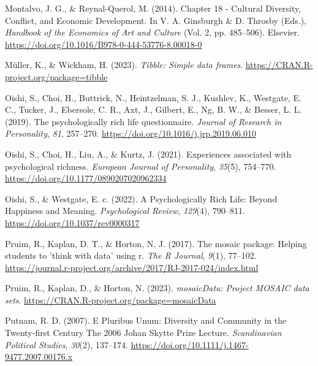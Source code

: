 \documentclass[
  man,floatsintext]{apa7}
\newlength{\cslhangindent}
\newlength{\cslentryspacingunit} %
\newenvironment{CSLReferences}[2] %
 {%
  \setlength{\parindent}{0pt}
  \ifodd #1
  \let\oldpar\par
  \def\par{\hangindent=\cslhangindent\oldpar}
  \fi
  \setlength{\parskip}{#2\cslentryspacingunit}
 }%
 {}
\begin{document}
\begin{CSLReferences}{1}{0}
\leavevmode{}%
Montalvo, J. G., \& Reynal-Querol, M. (2014). Chapter 18 - {Cultural Diversity}, {Conflict}, and {Economic Development}. In V. A. Ginsburgh \& D. Throsby (Eds.), \emph{Handbook of the {Economics} of {Art} and {Culture}} (Vol. 2, pp. 485--506). Elsevier. \url{https://doi.org/10.1016/B978-0-444-53776-8.00018-0}

\leavevmode{}%
Müller, K., \& Wickham, H. (2023). \emph{Tibble: Simple data frames}. \url{https://CRAN.R-project.org/package=tibble}

\leavevmode{}%
Oishi, S., Choi, H., Buttrick, N., Heintzelman, S. J., Kushlev, K., Westgate, E. C., Tucker, J., Ebersole, C. R., Axt, J., Gilbert, E., Ng, B. W., \& Besser, L. L. (2019). The psychologically rich life questionnaire. \emph{Journal of Research in Personality}, \emph{81}, 257--270. \url{https://doi.org/10.1016/j.jrp.2019.06.010}

\leavevmode{}%
Oishi, S., Choi, H., Liu, A., \& Kurtz, J. (2021). Experiences associated with psychological richness. \emph{European Journal of Personality}, \emph{35}(5), 754--770. \url{https://doi.org/10.1177/0890207020962334}

\leavevmode{}%
Oishi, S., \& Westgate, E. c. (2022). A {Psychologically Rich Life}: {Beyond Happiness} and {Meaning}. \emph{Psychological Review}, \emph{129}(4), 790--811. \url{https://doi.org/10.1037/rev0000317}

\leavevmode{}%
Pruim, R., Kaplan, D. T., \& Horton, N. J. (2017). The mosaic package: Helping students to 'think with data' using r. \emph{The R Journal}, \emph{9}(1), 77--102. \url{https://journal.r-project.org/archive/2017/RJ-2017-024/index.html}

\leavevmode{}%
Pruim, R., Kaplan, D., \& Horton, N. (2023). \emph{mosaicData: Project MOSAIC data sets}. \url{https://CRAN.R-project.org/package=mosaicData}

\leavevmode{}%
Putnam, R. D. (2007). E {Pluribus Unum}: {Diversity} and {Community} in the {Twenty-first Century The} 2006 {Johan Skytte Prize Lecture}. \emph{Scandinavian Political Studies}, \emph{30}(2), 137--174. \url{https://doi.org/10.1111/j.1467-9477.2007.00176.x}


\end{CSLReferences}
\end{document}

